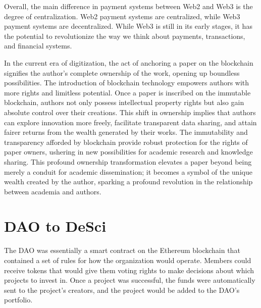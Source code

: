 \documentclass[lettersize,journal]{IEEEtran}
\begin{document}
Overall, the main difference in payment systems between Web2 and Web3 is the degree of centralization. Web2 payment systems are centralized, while Web3 payment systems are decentralized. While Web3 is still in its early stages, it has the potential to revolutionize the way we think about payments, transactions, and financial systems.



In the current era of digitization, the act of anchoring a paper on the blockchain signifies the author's complete ownership of the work, opening up boundless possibilities. The introduction of blockchain technology empowers authors with more rights and limitless potential. Once a paper is inscribed on the immutable blockchain, authors not only possess intellectual property rights but also gain absolute control over their creations. This shift in ownership implies that authors can explore innovation more freely, facilitate transparent data sharing, and attain fairer returns from the wealth generated by their works. The immutability and transparency afforded by blockchain provide robust protection for the rights of paper owners, ushering in new possibilities for academic research and knowledge sharing. This profound ownership transformation elevates a paper beyond being merely a conduit for academic dissemination; it becomes a symbol of the unique wealth created by the author, sparking a profound revolution in the relationship between academia and authors.

  

\section{DAO to DeSci}

The DAO was essentially a smart contract on the Ethereum blockchain that contained a set of rules for how the organization would operate. Members could receive tokens that would give them voting rights to make decisions about which projects to invest in. Once a project was successful, the funds were automatically sent to the project's creators, and the project would be added to the DAO's portfolio.
\end{document}
